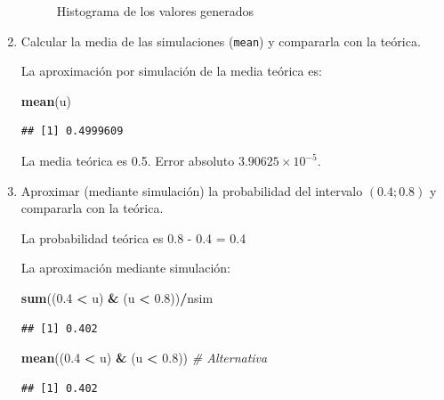 \documentclass[]{book}
\newenvironment{Shaded}{\begin{snugshade}}{\end{snugshade}}
\newcommand{\KeywordTok}[1]{\textcolor[rgb]{0.13,0.29,0.53}{\textbf{#1}}}
\newcommand{\FloatTok}[1]{\textcolor[rgb]{0.00,0.00,0.81}{#1}}
\newcommand{\StringTok}[1]{\textcolor[rgb]{0.31,0.60,0.02}{#1}}
\newcommand{\CommentTok}[1]{\textcolor[rgb]{0.56,0.35,0.01}{\textit{#1}}}
\newcommand{\OperatorTok}[1]{\textcolor[rgb]{0.81,0.36,0.00}{\textbf{#1}}}
\newcommand{\NormalTok}[1]{#1}
\theoremstyle{definition}
\theoremstyle{definition}
\theoremstyle{definition}
\theoremstyle{remark}
\begin{document}
\begin{enumerate}
\begin{figure}[!htb]
{  }

  \caption{Histograma de los valores generados}\label{fig:ejcona}
  \end{figure}
\item
  Calcular la media de las simulaciones (\texttt{mean}) y compararla con
  la teórica.

  La aproximación por simulación de la media teórica es:

\begin{Shaded}
\begin{Highlighting}[]
\KeywordTok{mean}\NormalTok{(u)}
\end{Highlighting}
\end{Shaded}

\begin{verbatim}
## [1] 0.4999609
\end{verbatim}

  La media teórica es 0.5. Error absoluto \(3.90625\times 10^{-5}\).
\item
  Aproximar (mediante simulación) la probabilidad del intervalo
  \((0.4;0.8)\) y compararla con la teórica.

  La probabilidad teórica es 0.8 - 0.4 = 0.4

  La aproximación mediante simulación:

\begin{Shaded}
\begin{Highlighting}[]
\KeywordTok{sum}\NormalTok{((}\FloatTok{0.4} \OperatorTok{<}\StringTok{ }\NormalTok{u) }\OperatorTok{&}\StringTok{ }\NormalTok{(u }\OperatorTok{<}\StringTok{ }\FloatTok{0.8}\NormalTok{))}\OperatorTok{/}\NormalTok{nsim}
\end{Highlighting}
\end{Shaded}

\begin{verbatim}
## [1] 0.402
\end{verbatim}

\begin{Shaded}
\begin{Highlighting}[]
\KeywordTok{mean}\NormalTok{((}\FloatTok{0.4} \OperatorTok{<}\StringTok{ }\NormalTok{u) }\OperatorTok{&}\StringTok{ }\NormalTok{(u }\OperatorTok{<}\StringTok{ }\FloatTok{0.8}\NormalTok{))     }\CommentTok{# Alternativa}
\end{Highlighting}
\end{Shaded}

\begin{verbatim}
## [1] 0.402
\end{verbatim}
\end{enumerate}
\end{document}
